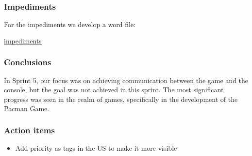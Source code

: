 \newpage





\subsubsection{Impediments}
For the impediments we develop a word file:

\href{https://docs.google.com/spreadsheets/d/1S3ndUFktff6ETyNhOyirIFNed71W4ApTLGyjX8xSzUQ/edit?usp=sharing}{impediments}

\subsubsection{Conclusions}

In Sprint 5, our focus was on achieving communication between the game and the console, but the goal was not achieved in this sprint. The most significant progress was seen in the realm of games, specifically in the development of the Pacman Game.

\subsubsection{Action items}

\begin{itemize}
    \item Add priority as tags in the US to make it more visible
\end{itemize}
